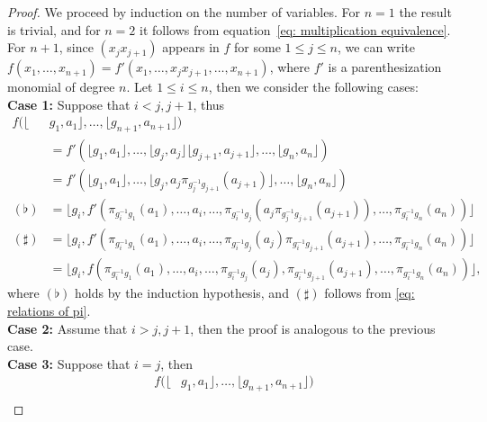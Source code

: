 \documentclass[11pt]{amsart}
\numberwithin{equation}{section}
\theoremstyle{definition}
\theoremstyle{remark}
\begin{document}
\begin{proof}
    We proceed by induction on the number of variables.
    For \(n = 1\) the result is trivial, and for \(n=2\) it follows from equation~\eqref{eq: multiplication equivalence}.
     For \(n+1\), since $(x_j x_{j+1})$ appears in $f$ for some \(1 \leq j \leq n\), we can write \(f(x_1, \ldots, x_{n+1}) = f'(x_1, \ldots, x_j x_{j+1}, \ldots, x_{n+1})\), where  \(f'\) is a parenthesization monomial of degree \(n\).
    Let \(1 \leq i \leq n\),  then we consider the following cases:\\
   \textbf{Case 1:} Suppose  that \(i < j, j+1\), thus
    \begin{align*}
        f(\lfloor &g_1, a_1 \rfloor, \ldots, \lfloor g_{n+1}, a_{n+1} \rfloor) \\ 
        &= f'(\lfloor g_1, a_1 \rfloor, \ldots, \lfloor g_j, a_j \rfloor \lfloor g_{j+1}, a_{j+1} \rfloor, \ldots, \lfloor g_n, a_n \rfloor) \\
        &= f'(\lfloor g_1, a_1 \rfloor, \ldots,
            \lfloor g_j, a_{j}\pi_{g_j^{-1}g_{j+1}}(a_{j+1})\rfloor,
            \ldots, \lfloor g_n, a_n \rfloor) \\
        (\flat)&= \lfloor 
            g_i,
            f'(
            \pi_{g_i^{-1}g_1}(a_1), \ldots, a_i, \ldots,
            \pi_{g_i^{-1}g_j}(a_j \pi_{g_j^{-1}g_{j+1}}(a_{j+1})),
            \ldots,\pi_{g_i^{-1}g_n}(a_n)
            )
            \rfloor \\
        (\sharp)&= \lfloor 
            g_i,
            f'(
            \pi_{g_i^{-1}g_1}(a_1), \ldots, a_i, \ldots,
            \pi_{g_i^{-1}g_j}(a_j) \pi_{g_i^{-1}g_{j+1}}(a_{j+1}),
            \ldots,\pi_{g_i^{-1}g_n}(a_n)
            )
            \rfloor \\
        &= \lfloor 
            g_i,
            f(
            \pi_{g_i^{-1}g_1}(a_1), \ldots, a_i, \ldots,
            \pi_{g_i^{-1}g_j}(a_j), \pi_{g_i^{-1}g_{j+1}}(a_{j+1}),
            \ldots,\pi_{g_i^{-1}g_n}(a_n)
            )
            \rfloor,
    \end{align*}
    where \((\flat)\) holds by the induction hypothesis, and \((\sharp)\) follows from \eqref{eq: relations of pi}.\\
 \textbf{Case 2:} Assume that \(i > j, j+1\), then the proof is analogous to the previous case.\\
  \textbf{Case 3:} Suppose that \(i = j\), then
    \begin{align*}
        f(\lfloor &g_1, a_1 \rfloor, \ldots, \lfloor g_{n+1}, a_{n+1} \rfloor) \\ 

\end{align*}
\end{proof}
\end{document}
